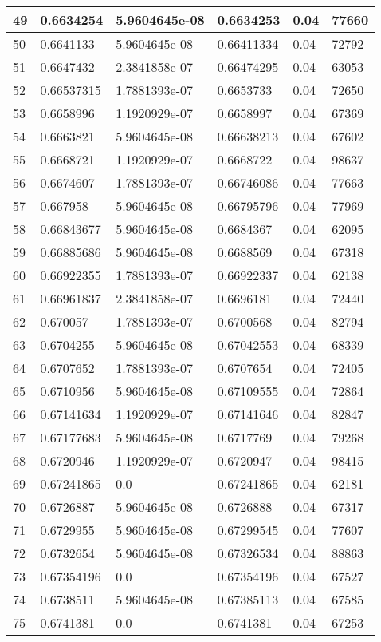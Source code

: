 \begin{longtable}{|l|l|l|l|l|l|}
49 & 0.6634254 & 5.9604645e-08 & 0.6634253 & 0.04 & 77660 \\ \hline 
50 & 0.6641133 & 5.9604645e-08 & 0.66411334 & 0.04 & 72792 \\ \hline 
51 & 0.6647432 & 2.3841858e-07 & 0.66474295 & 0.04 & 63053 \\ \hline 
52 & 0.66537315 & 1.7881393e-07 & 0.6653733 & 0.04 & 72650 \\ \hline 
53 & 0.6658996 & 1.1920929e-07 & 0.6658997 & 0.04 & 67369 \\ \hline 
54 & 0.6663821 & 5.9604645e-08 & 0.66638213 & 0.04 & 67602 \\ \hline 
55 & 0.6668721 & 1.1920929e-07 & 0.6668722 & 0.04 & 98637 \\ \hline 
56 & 0.6674607 & 1.7881393e-07 & 0.66746086 & 0.04 & 77663 \\ \hline 
57 & 0.667958 & 5.9604645e-08 & 0.66795796 & 0.04 & 77969 \\ \hline 
58 & 0.66843677 & 5.9604645e-08 & 0.6684367 & 0.04 & 62095 \\ \hline 
59 & 0.66885686 & 5.9604645e-08 & 0.6688569 & 0.04 & 67318 \\ \hline 
60 & 0.66922355 & 1.7881393e-07 & 0.66922337 & 0.04 & 62138 \\ \hline 
61 & 0.66961837 & 2.3841858e-07 & 0.6696181 & 0.04 & 72440 \\ \hline 
62 & 0.670057 & 1.7881393e-07 & 0.6700568 & 0.04 & 82794 \\ \hline 
63 & 0.6704255 & 5.9604645e-08 & 0.67042553 & 0.04 & 68339 \\ \hline 
64 & 0.6707652 & 1.7881393e-07 & 0.6707654 & 0.04 & 72405 \\ \hline 
65 & 0.6710956 & 5.9604645e-08 & 0.67109555 & 0.04 & 72864 \\ \hline 
66 & 0.67141634 & 1.1920929e-07 & 0.67141646 & 0.04 & 82847 \\ \hline 
67 & 0.67177683 & 5.9604645e-08 & 0.6717769 & 0.04 & 79268 \\ \hline 
68 & 0.6720946 & 1.1920929e-07 & 0.6720947 & 0.04 & 98415 \\ \hline 
69 & 0.67241865 & 0.0 & 0.67241865 & 0.04 & 62181 \\ \hline 
70 & 0.6726887 & 5.9604645e-08 & 0.6726888 & 0.04 & 67317 \\ \hline 
71 & 0.6729955 & 5.9604645e-08 & 0.67299545 & 0.04 & 77607 \\ \hline 
72 & 0.6732654 & 5.9604645e-08 & 0.67326534 & 0.04 & 88863 \\ \hline 
73 & 0.67354196 & 0.0 & 0.67354196 & 0.04 & 67527 \\ \hline 
74 & 0.6738511 & 5.9604645e-08 & 0.67385113 & 0.04 & 67585 \\ \hline 
75 & 0.6741381 & 0.0 & 0.6741381 & 0.04 & 67253 \\ \hline 
\end{longtable}